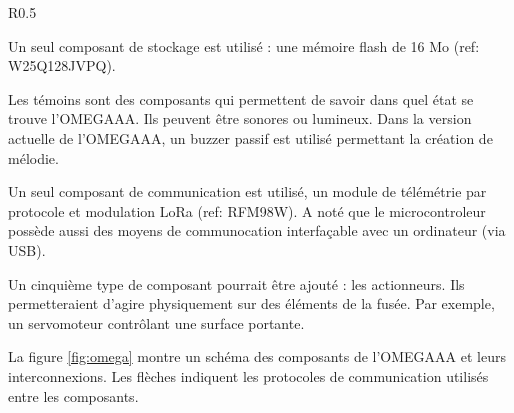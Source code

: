 \begin{minipage}{0.95\textwidth}
\begin{wrapfigure}{R}{0.5\textwidth}
\begin{tikzpicture}[scale=1.2]
        \end{tikzpicture}
        \caption{Schéma des composants de l'OMEGAAA}
        \label{fig:omega}
    \end{wrapfigure}

Un seul composant de stockage est utilisé : une mémoire flash de 16 Mo
(ref: W25Q128JVPQ).

\vspace{0.5cm}

Les témoins sont des composants qui permettent de savoir dans quel état se
trouve l'OMEGAAA. Ils peuvent être sonores ou lumineux. Dans la version actuelle
de l'OMEGAAA, un buzzer passif est utilisé permettant la création de mélodie.

\vspace{0.5cm}

Un seul composant de communication est utilisé, un module de télémétrie par
protocole et modulation LoRa (ref: RFM98W). A noté que le microcontroleur
possède aussi des moyens de communocation interfaçable avec un ordinateur (via
USB).

\vspace{0.5cm}

Un cinquième type de composant pourrait être ajouté : les actionneurs. Ils
permetteraient d'agire physiquement sur des éléments de la fusée. Par exemple,
un servomoteur contrôlant une surface portante.

\end{minipage}

\vspace{0.5cm}

La figure \ref{fig:omega} montre un schéma des composants de l'OMEGAAA et
leurs interconnexions. Les flèches indiquent les protocoles de communication
utilisés entre les composants.\\



